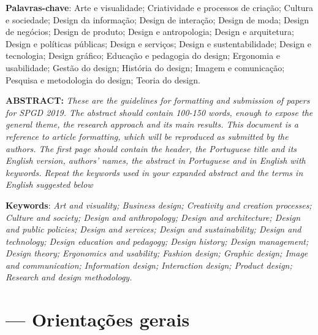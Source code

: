 \documentclass[a4paper,11pt,oneside,onecolumn,final]{article}
\begin{document}
\begin{titlepage}
\textbf{Palavras-chave}: Arte e visualidade; Criatividade e processos de criação; Cultura e sociedade; Design da informação; Design de interação; Design de moda; Design de negócios; Design de produto; Design e antropologia; Design e arquitetura; Design e políticas públicas; Design e serviços; Design e sustentabilidade; Design e tecnologia; Design gráfico; Educação e pedagogia do design; Ergonomia e usabilidade; Gestão do design; História do design; Imagem e comunicação; Pesquisa e metodologia do design; Teoria do design.

\vspace{10mm} %



\textbf{ABSTRACT:} \textit{These are the guidelines for formatting and submission of papers for SPGD 2019. The abstract should contain 100-150 words, enough to expose the general theme, the research approach and its main results. This document is a reference to article formatting, which will be reproduced as submitted by the authors. The first page should contain the header, the Portuguese title and its English version, authors' names, the abstract in Portuguese and in English with keywords. Repeat the keywords used in your expanded abstract and the terms in English suggested below}

\vspace{5mm} %

\textbf{Keywords}: \textit{Art and visuality; Business design; Creativity and creation processes; Culture and society; Design and anthropology; Design and architecture; Design and public policies; Design and services; Design and sustainability; Design and technology; Design education and pedagogy; Design history; Design management; Design theory; Ergonomics and usability; Fashion design; Graphic design; Image and communication; Information design; Interaction design; Product design; Research and design methodology.}

\end{titlepage}


\setlength{\parskip}{5pt} %
\renewcommand{\baselinestretch}{1.15} %


\section{— Orientações gerais}
\end{document}
